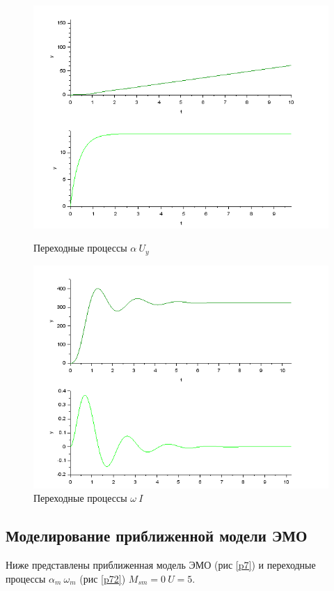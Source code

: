 \documentclass[a4paper,12pt,russian]{article} %
\begin{document}
\begin{figure}[H]
	\includegraphics[width=\linewidth]{61.png}
	\caption{Переходные процессы $\alpha\:  U_y$}\label{p61}
	\endminipage\hfill
	\includegraphics[width=\linewidth]{62.png}
	\caption{Переходные процессы $\omega\:  I$}\label{p62}
	\endminipage
\end{figure}

\subsection{Моделирование приближенной модели ЭМО}
Ниже представлены приближенная модель ЭМО (рис \ref{p7}) и переходные процессы  $\alpha_m\:  \omega_m$ (рис \ref{p72}) $M_{sm}=0\: U=5$.
\end{document}
